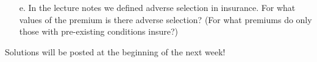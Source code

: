 \documentclass{article}
\begin{document}
\begin{enumerate}
\begin{enumerate}
        \item[e.] In the lecture notes we defined adverse selection in insurance. For what values of the premium is there adverse selection? (For what premiums do only those with pre-existing conditions insure?)
        
        
        
        
    \end{enumerate}
        
\end{enumerate}

Solutions will be posted at the beginning of the next week!
\end{document}
